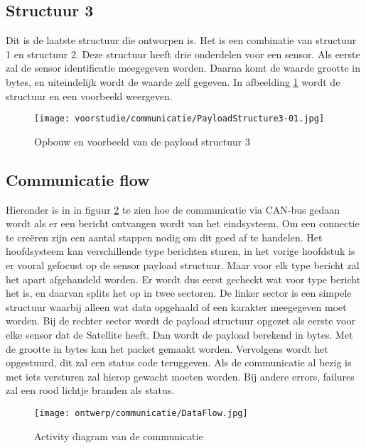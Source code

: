 \subsection{Structuur 3}
Dit is de laatste structuur die ontworpen is. Het is een combinatie van structuur 1 en structuur 2. Deze structuur heeft drie onderdelen voor een sensor. Als eerste zal de sensor identificatie meegegeven worden. Daarna komt de waarde grootte in bytes, en uiteindelijk wordt de waarde zelf gegeven. In afbeelding \ref{fig:Structure3} wordt de structuur en een voorbeeld weergeven.
\begin{figure}[h!]
	\label{fig:Structure3}

	\texttt{[image: voorstudie/communicatie/PayloadStructure3-01.jpg]}
	\caption{Opbouw en voorbeeld van de payload structuur 3}
\end{figure}

\newpage
\subsection{Communicatie flow}
Hieronder is in in figuur \ref{fig:comflow} te zien hoe de communicatie via CAN-bus gedaan wordt als er een bericht ontvangen wordt van het eindsysteem. Om een connectie te creëren zijn een aantal stappen nodig om dit goed af te handelen. Het hoofdsysteem kan verschillende type berichten sturen, in het vorige hoofdstuk is er vooral gefocust op de sensor payload structuur. Maar voor elk type bericht zal het apart afgehandeld worden. Er wordt dus eerst gecheckt wat voor type bericht het is, en daarvan splits het op in twee sectoren. De linker sector is een simpele structuur waarbij alleen wat data opgehaald of een karakter meegegeven moet worden. Bij de rechter sector wordt de payload structuur opgezet als eerste voor elke sensor dat de Satellite heeft. Dan wordt de payload berekend in bytes. Met de grootte in bytes kan het packet gemaakt worden. Vervolgens wordt het opgestuurd, dit zal een status code teruggeven. Als de communicatie al bezig is met iets versturen zal hierop gewacht moeten worden. Bij andere errors, failures zal een rood lichtje branden als status.
\begin{figure}[h!]
	\centering
	\label{fig:comflow}

	\texttt{[image: ontwerp/communicatie/DataFlow.jpg]}
	\caption{Activity diagram van de communicatie}
\end{figure}

\newpage
